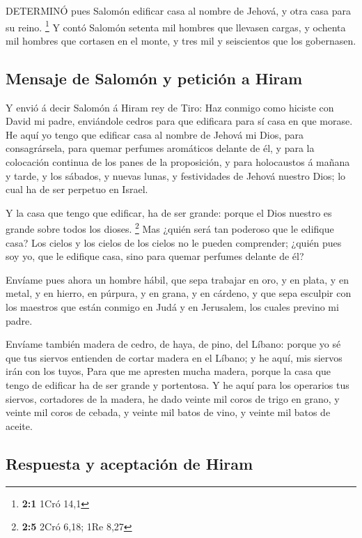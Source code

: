  DETERMINÓ pues Salomón edificar casa al nombre de Jehová, y
otra casa para su reino. \footnote{\textbf{2:1} 1Cró 14,1} 
Y contó Salomón setenta mil hombres que llevasen cargas, y ochenta mil
hombres que cortasen en el monte, y tres mil y seiscientos que los
gobernasen.

\hypertarget{mensaje-de-salomuxf3n-y-peticiuxf3n-a-hiram}{%
\subsection{Mensaje de Salomón y petición a
Hiram}\label{mensaje-de-salomuxf3n-y-peticiuxf3n-a-hiram}}

 Y envió á decir Salomón á Hiram rey de Tiro: Haz conmigo
como hiciste con David mi padre, enviándole cedros para que edificara
para sí casa en que morase.  He aquí yo tengo que edificar
casa al nombre de Jehová mi Dios, para consagrársela, para quemar
perfumes aromáticos delante de él, y para la colocación continua de los
panes de la proposición, y para holocaustos á mañana y tarde, y los
sábados, y nuevas lunas, y festividades de Jehová nuestro Dios; lo cual
ha de ser perpetuo en Israel.

 Y la casa que tengo que edificar, ha de ser grande: porque
el Dios nuestro es grande sobre todos los dioses. \footnote{\textbf{2:5}
  2Cró 6,18; 1Re 8,27}  Mas ¿quién será tan poderoso que le
edifique casa? Los cielos y los cielos de los cielos no le pueden
comprender; ¿quién pues soy yo, que le edifique casa, sino para quemar
perfumes delante de él?

 Envíame pues ahora un hombre hábil, que sepa trabajar en
oro, y en plata, y en metal, y en hierro, en púrpura, y en grana, y en
cárdeno, y que sepa esculpir con los maestros que están conmigo en Judá
y en Jerusalem, los cuales previno mi padre.

 Envíame también madera de cedro, de haya, de pino, del
Líbano: porque yo sé que tus siervos entienden de cortar madera en el
Líbano; y he aquí, mis siervos irán con los tuyos,  Para que
me apresten mucha madera, porque la casa que tengo de edificar ha de ser
grande y portentosa.  Y he aquí para los operarios tus
siervos, cortadores de la madera, he dado veinte mil coros de trigo en
grano, y veinte mil coros de cebada, y veinte mil batos de vino, y
veinte mil batos de aceite.

\hypertarget{respuesta-y-aceptaciuxf3n-de-hiram}{%
\subsection{Respuesta y aceptación de
Hiram}\label{respuesta-y-aceptaciuxf3n-de-hiram}}

